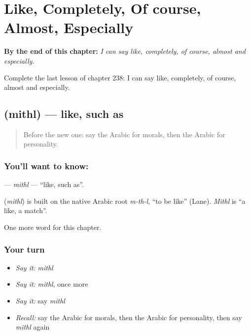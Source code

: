 
\chapter{Like, Completely, Of course, Almost, Especially}
\label{ch:ar-like-completely-of-course-almost-especially}

\begin{chapteropening}
\textbf{By the end of this chapter:} \emph{I can say like, completely, of course, almost and especially.}

Complete the last lesson of chapter 238: I can say like, completely, of course, almost and especially.
\end{chapteropening}

\section[\texorpdfstring{\ar{مثل} (mithl)}{مثل (mithl)}]{ (mithl) — like, such as}

\label{lesson:AR-C238-mithl}



\begin{quote}
Before the new one: say the Arabic for morals, then the Arabic for personality.
\end{quote}

\subsection*{You'll want to know: }
\textbf{} — \emph{mithl} — \textquotedblleft{}like, such as\textquotedblright{}.

\begin{cousinweb}
\textbf{} (\emph{mithl}) is built on the native Arabic root \emph{m-th-l}, \textquotedblleft{}to be like\textquotedblright{} (Lane). \emph{Mithl} is \textquotedblleft{}a like, a match\textquotedblright{}.
\end{cousinweb}

\begin{grammarlens}[title={What you've built}]
One more word for this chapter.
\end{grammarlens}

\subsection*{Your turn}
\begin{itemize}
\raggedright
  \item \emph{Say it:} \emph{mithl}
  \item \emph{Say it:} \emph{mithl}, once more
  \item \emph{Say it:} say \emph{mithl}
  \item \emph{Recall:} say the Arabic for morals, then the Arabic for personality, then say \emph{mithl} again
\end{itemize}

